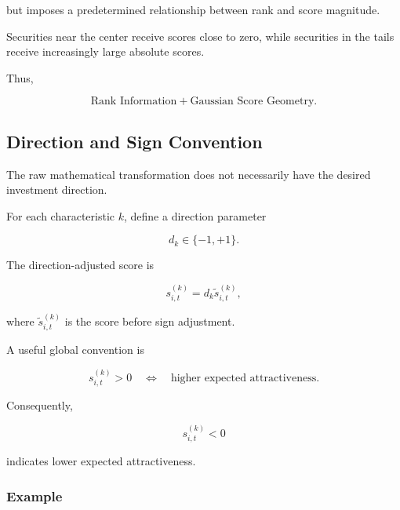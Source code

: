 \documentclass[11pt,a4paper]{article}
\begin{document}
but imposes a predetermined relationship between rank and score magnitude.

Securities near the center receive scores close to zero, while securities in
the tails receive increasingly large absolute scores.

Thus,

\begin{equation}
\boxed{
\text{Rank Information}
+
\text{Gaussian Score Geometry}.
}
\end{equation}


\subsection{Direction and Sign Convention}
\label{subsec:direction_sign_convention}

The raw mathematical transformation does not necessarily have the desired
investment direction.

For each characteristic $k$, define a direction parameter

\begin{equation}
d_k
\in
\{-1,+1\}.
\end{equation}

The direction-adjusted score is

\begin{equation}
\boxed{
s_{i,t}^{(k)}
=
d_k
\widetilde{s}_{i,t}^{(k)},
}
\end{equation}

where $\widetilde{s}_{i,t}^{(k)}$ is the score before sign adjustment.

A useful global convention is

\begin{equation}
\boxed{
s_{i,t}^{(k)}>0
\quad\Longleftrightarrow\quad
\text{higher expected attractiveness}.
}
\end{equation}

Consequently,

\begin{equation}
s_{i,t}^{(k)}<0
\end{equation}

indicates lower expected attractiveness.


\subsubsection{Example}
\end{document}
